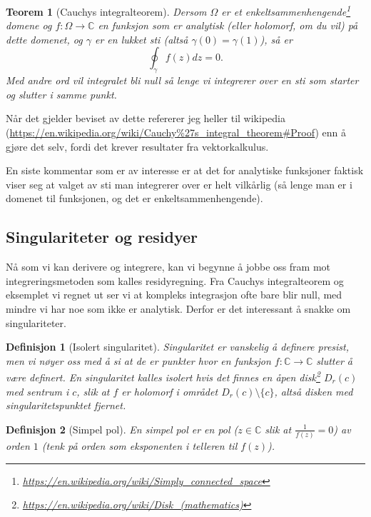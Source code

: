 \documentclass{article}
\newtheorem{theorem}{Teorem}
\newtheorem{definition}{Definisjon}
\begin{document}
\begin{theorem}[Cauchys integralteorem]
    Dersom $\Omega$ er et enkeltsammenhengende\footnote{\url{https://en.wikipedia.org/wiki/Simply_connected_space}} domene og $f:\Omega \longrightarrow \mathbb{C}$ en funksjon som er analytisk (eller holomorf, om du vil) på dette domenet, og $\gamma$ er en lukket sti (altså $\gamma(0) = \gamma(1)$), så er 
    \[
        \oint_\gamma f(z) dz = 0.
    \]
    Med andre ord vil integralet bli null så lenge vi integrerer over en sti som starter og slutter i samme punkt.
\end{theorem}

Når det gjelder beviset av dette refererer jeg heller til wikipedia (\url{https://en.wikipedia.org/wiki/Cauchy%27s_integral_theorem#Proof}) enn å gjøre det selv, fordi det krever resultater fra vektorkalkulus.

En siste kommentar som er av interesse er at det for analytiske funksjoner faktisk viser seg at valget av sti man integrerer over er helt vilkårlig (så lenge man er i domenet til funksjonen, og det er enkeltsammenhengende).

\subsection{Singulariteter og residyer}

Nå som vi kan derivere og integrere, kan vi begynne å jobbe oss fram mot integreringsmetoden som kalles residyregning. Fra Cauchys integralteorem og eksemplet vi regnet ut ser vi at kompleks integrasjon ofte bare blir null, med mindre vi har noe som ikke er analytisk. Derfor er det interessant å snakke om singulariteter.

\begin{definition}[Isolert singularitet]
    Singularitet er vanskelig å definere presist, men vi nøyer oss med å si at de er punkter hvor en funksjon $f:\mathbb{C} \longrightarrow \mathbb{C}$ slutter å være definert. En singularitet kalles isolert hvis det finnes en åpen disk\footnote{\url{https://en.wikipedia.org/wiki/Disk_(mathematics)}} $D_r(c)$ med sentrum i $c$, slik at $f$ er holomorf i området $D_r(c) \setminus \{c\}$, altså disken med singularitetspunktet fjernet.
\end{definition}

\begin{definition}[Simpel pol]
    En simpel pol er en pol ($z \in \mathbb{C}$ slik at $\frac{1}{f(z)} = 0$) av orden $1$ (tenk på orden som eksponenten i telleren til $f(z)$).
\end{definition}
\end{document}
